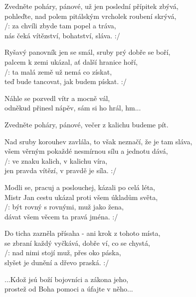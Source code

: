 
\ve{}
Zvedněte poháry, pánové, už jen poslední přípitek zbývá,\\
pohleďte, nad polem pitálským vrcholek roubení skrývá,\\
/: za chvíli zbyde tam popel a tráva,\\
nás čeká vítězství, bohatství, sláva. :/

\ve{}
Ryšavý panovník jen se smál, sruby prý dobře se boří,\\
palcem k zemi ukázal, ať další hranice hoří,\\
/: ta malá země už nemá co získat,\\
teď bude tancovat, jak budem pískat. :/ 

\cho{}
Náhle se pozvedl vítr a mocně vál,\\
odněkud přinesl nápěv, sám si ho hrál, hm... \quad {} \quad {} \quad {} 
   
\re{}
Zvedněte poháry, pánové, večer z kalichu budeme pít. 

\ve{}
Nad sruby korouhev zavlála, to však neznačí, že je tam sláva,\\
všem věrným pokaždé nesmírnou sílu a jednotu dává,\\
/: ve znaku kalich, v kalichu víra,\\
jen pravda vítězí, v pravdě je síla. :/

\ve{}
Modli se, pracuj a poslouchej, kázali po celá léta,\\
Mistr Jan cestu ukázal proti všem úkladům světa,\\
/: být rovný s rovnými, muž jako žena,\\
dávat všem věcem ta pravá jména. :/

\ve{}
Do ticha zazněla přísaha - ani krok z tohoto místa,\\
se zbraní každý vyčkává, dobře ví, co se chystá,\\
/: nad nimi stojí muž, přes oko páska,\\
slyšet je dunění a dřevo praská. :/

\cho{}
...Kdož jsú boží bojovníci a zákona jeho,\\
prostež od Boha pomoci a úfajte v něho... 

\esong